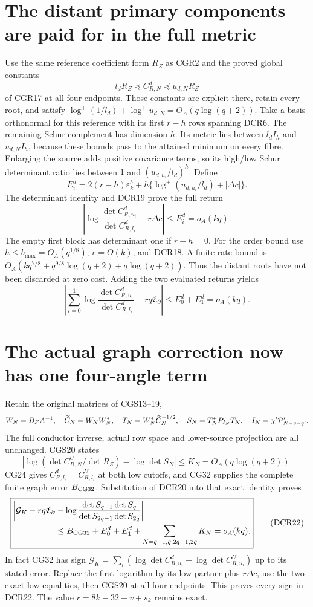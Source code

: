 \documentclass[11pt]{article}
\newcommand{\lp}{\log^+}
\begin{document}
\section{The distant primary components are paid for in the full metric}

Use the same reference coefficient form \(R_Z\) as CGR2 and the
proved global constants
\[
 l_d R_Z\preceq C_{R,N}^d\preceq u_{d,N}R_Z
\]
of CGR17 at all four endpoints. Those constants are explicit there,
retain every root, and satisfy
\(\log^+(1/l_d)+\log^+u_{d,N}=O_A(q\log(q+2))\).
Take a basis orthonormal for this reference with its first \(r-h\)
rows spanning DCR6. The remaining Schur complement has dimension
\(h\). Its metric lies between \(l_d I_h\) and \(u_{d,N}I_h\),
because these bounds pass to the attained minimum on every fibre.
Enlarging the source adds positive covariance terms, so its
high/low Schur determinant ratio lies between \(1\) and
\((u_{d,u_i}/l_d)^h\). Define
\[
E_i^d=2(r-h)\varepsilon_k^b+
 h\{\lp(u_{d,u_i}/l_d)+|\Delta c|\}.
\]
The determinant identity and DCR19 prove the full return
\[
\boxed{\left|\log\frac{\det C_{R,u_i}^d}{\det C_{R,l_i}^d}
                   -r\Delta c\right|\le E_i^d=o_A(kq).}
\tag{DCR20}
\]
The empty first block has determinant one if \(r-h=0\).
For the order bound use \(h\le b_{\max}=O_A(q^{1/8})\),
\(r=O(k)\), and DCR18. A finite rate bound is
\(O_A(kq^{7/8}+q^{9/8}\log(q+2)+q\log(q+2))\).
Thus the distant roots have not been discarded at zero cost.
Adding the two evaluated returns yields
\[
\boxed{
\left|\sum_{i=0}^1\log\frac{\det C_{R,u_i}^d}{\det C_{R,l_i}^d}
                 -rq\mathfrak C_\partial\right|
 \le E_0^d+E_1^d=o_A(kq).}
\tag{DCR21}
\]

\section{The actual graph correction now has one four-angle term}

Retain the original matrices of CGS13--19,
\[
W_N=B_FA^{-1},\quad \widetilde C_N=W_NW_N^*,\quad
T_N=W_N^*\widetilde C_N^{-1/2},\quad
S_N=T_N^*P_{I_N}T_N,\quad
I_N=\chi'\mathcal P'_{N-v-q'}.
\]
The full conductor inverse, actual row space and lower-source
projection are all unchanged. CGS20 states
\[
\left|\log(\det C_{R,N}^U/\det R_Z)-\log\det S_N\right|
 \le K_N=O_A(q\log(q+2)).
\]
CG24 gives \(C_{R,l_i}^d=C_{R,l_i}^U\) at both low cutoffs,
and CG32 supplies the complete finite graph error \(B_{\rm CG32}\).
Substitution of DCR20 into that exact identity proves
\[
\boxed{
\begin{aligned}
\bigg|\mathcal G_K-rq\mathfrak C_\partial
 &-\log\frac{\det S_{q-1}\det S_q}
                 {\det S_{2q-1}\det S_{2q}}\bigg|\\
&\le B_{\rm CG32}+E_0^d+E_1^d+
             \sum_{N=q-1,q,2q-1,2q}K_N=o_A(kq).
\end{aligned}}
\tag{DCR22}
\]
In fact CG32 has sign
\(\mathcal G_K=\sum_i(\log\det C_{R,u_i}^d
-\log\det C_{R,u_i}^U)\) up to its stated error.
Replace the first logarithm by its low partner plus \(r\Delta c\),
use the two exact low equalities, then CGS20 at all four endpoints.
This proves every sign in DCR22. The value
\(r=8k-32-v+s_k\) remains exact.
\end{document}
